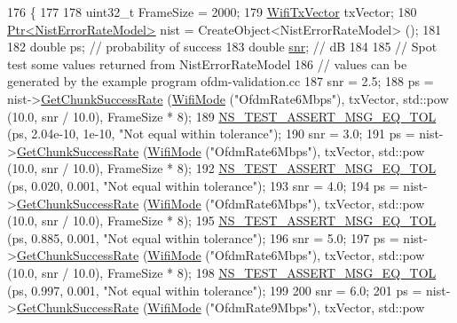 \begin{DoxyCode}
176 \{
177 
178   uint32\_t FrameSize = 2000;
179   \hyperlink{classns3_1_1WifiTxVector}{WifiTxVector} txVector;
180   \hyperlink{classns3_1_1Ptr}{Ptr<NistErrorRateModel>} nist = CreateObject<NistErrorRateModel> ();
181 
182   \textcolor{keywordtype}{double} ps; \textcolor{comment}{// probability of success}
183   \textcolor{keywordtype}{double} \hyperlink{lte__amc_8m_a7543c5e4e80c828b652e0c63e4a6de70}{snr}; \textcolor{comment}{// dB}
184 
185   \textcolor{comment}{// Spot test some values returned from NistErrorRateModel}
186   \textcolor{comment}{// values can be generated by the example program ofdm-validation.cc}
187   snr = 2.5;
188   ps = nist->\hyperlink{classns3_1_1NistErrorRateModel_a2316a2c287485d7cc81198c90b246bc0}{GetChunkSuccessRate} (\hyperlink{classns3_1_1WifiMode}{WifiMode} (\textcolor{stringliteral}{"OfdmRate6Mbps"}), txVector, std::pow
       (10.0, snr / 10.0), FrameSize * 8);
189   \hyperlink{group__testing_ga9e7861b56b4e70db3b56044cb7a28e41}{NS\_TEST\_ASSERT\_MSG\_EQ\_TOL} (ps, 2.04e-10, 1e-10, \textcolor{stringliteral}{"Not equal within tolerance"});
190   snr = 3.0;
191   ps = nist->\hyperlink{classns3_1_1NistErrorRateModel_a2316a2c287485d7cc81198c90b246bc0}{GetChunkSuccessRate} (\hyperlink{classns3_1_1WifiMode}{WifiMode} (\textcolor{stringliteral}{"OfdmRate6Mbps"}), txVector, std::pow
       (10.0, snr / 10.0), FrameSize * 8);
192   \hyperlink{group__testing_ga9e7861b56b4e70db3b56044cb7a28e41}{NS\_TEST\_ASSERT\_MSG\_EQ\_TOL} (ps, 0.020, 0.001, \textcolor{stringliteral}{"Not equal within tolerance"});
193   snr = 4.0;
194   ps = nist->\hyperlink{classns3_1_1NistErrorRateModel_a2316a2c287485d7cc81198c90b246bc0}{GetChunkSuccessRate} (\hyperlink{classns3_1_1WifiMode}{WifiMode} (\textcolor{stringliteral}{"OfdmRate6Mbps"}), txVector, std::pow
       (10.0, snr / 10.0), FrameSize * 8);
195   \hyperlink{group__testing_ga9e7861b56b4e70db3b56044cb7a28e41}{NS\_TEST\_ASSERT\_MSG\_EQ\_TOL} (ps, 0.885, 0.001, \textcolor{stringliteral}{"Not equal within tolerance"});
196   snr = 5.0;
197   ps = nist->\hyperlink{classns3_1_1NistErrorRateModel_a2316a2c287485d7cc81198c90b246bc0}{GetChunkSuccessRate} (\hyperlink{classns3_1_1WifiMode}{WifiMode} (\textcolor{stringliteral}{"OfdmRate6Mbps"}), txVector, std::pow
       (10.0, snr / 10.0), FrameSize * 8);
198   \hyperlink{group__testing_ga9e7861b56b4e70db3b56044cb7a28e41}{NS\_TEST\_ASSERT\_MSG\_EQ\_TOL} (ps, 0.997, 0.001, \textcolor{stringliteral}{"Not equal within tolerance"});
199 
200   snr = 6.0;
201   ps = nist->\hyperlink{classns3_1_1NistErrorRateModel_a2316a2c287485d7cc81198c90b246bc0}{GetChunkSuccessRate} (\hyperlink{classns3_1_1WifiMode}{WifiMode} (\textcolor{stringliteral}{"OfdmRate9Mbps"}), txVector, std::pow

\end{DoxyCode}
